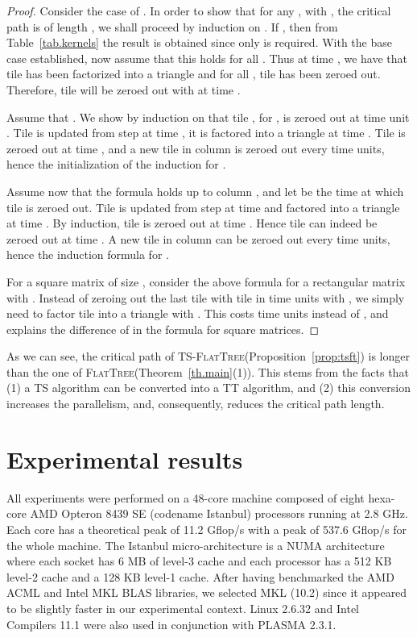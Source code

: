 \documentclass[a4paper,twopages]{article}
\newcommand{\TSFT}{\textsc{TS-FlatTree}\xspace}
\newcommand{\FT}{\textsc{FlatTree}\xspace}
\begin{document}
\begin{proof}
    Consider the case of . In order to show that for any ,
    with , the critical path is of length , we shall proceed by
    induction on .  If , then from Table~\ref{tab.kernels} the result
    is obtained since only  is required.  With the base case
    established, now assume that this holds for all .  Thus at
    time , we have that tile  has been factorized
    into a triangle and for all , tile  has been zeroed
    out.  Therefore, tile  will be zeroed out with  at time
    .

    Assume that . We show by induction on  that tile , for
    , is zeroed out at time unit .  Tile  is
    updated from step  at time , it is factored into a
    triangle at time . Tile  is zeroed out at time , and a new tile in column  is zeroed out
    every  time units, hence the initialization of the induction for .

    Assume now that the formula holds up to column , and let  be the time at which tile  is zeroed out.  Tile
     is updated from step  at time  and factored into a
    triangle at time . By induction, tile  is zeroed out at time
    .  Hence tile  can indeed be zeroed out at time
    . A new tile in column  can be zeroed out
    every  time units, hence the induction formula for .

    For a square matrix of size , consider the above formula for a
    rectangular matrix with . Instead of zeroing out the last tile
     with tile  in  time units with , we
    simply need to factor tile  into a triangle with . This
    costs  time units instead of , and explains the difference of  in
    the formula for square matrices.
\end{proof}

As we can see, the critical path of \TSFT (Proposition~\ref{prop:tsft})
is longer than the one of \FT (Theorem~\ref{th.main}(1)).
This stems from the facts that (1) a TS algorithm can be converted into a TT algorithm, and (2)
this conversion increases the parallelism, and, consequently, reduces the critical path length.



\section{Experimental results}
\label{sec.experiments}

All experiments were performed on a 48-core machine composed of eight
hexa-core AMD Opteron 8439 SE (codename Istanbul) processors running at 2.8
GHz. Each core has a theoretical peak of 11.2 Gflop/s with a peak of 537.6
Gflop/s for the whole machine. The Istanbul micro-architecture is a NUMA
architecture where each socket has 6 MB of level-3 cache and each processor has
a 512 KB level-2 cache and a 128 KB level-1 cache.  After having benchmarked
the AMD ACML and Intel MKL BLAS libraries, we selected MKL (10.2) since it
appeared to be slightly faster in our experimental context.  Linux 2.6.32 and
Intel Compilers 11.1 were also used in conjunction with PLASMA 2.3.1.
\end{document}
